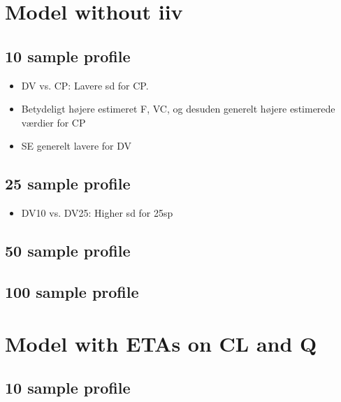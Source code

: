 \section{Model without iiv}
\subsection{10 sample profile}




\begin{itemize}
    \item DV vs. CP: Lavere sd for CP. 
    \item Betydeligt højere estimeret F, VC, og desuden generelt højere estimerede værdier for CP
    \item SE generelt lavere for DV
\end{itemize}

\subsection{25 sample profile}

\begin{itemize}
    \item DV10 vs. DV25: Higher sd for 25sp
\end{itemize}




\subsection{50 sample profile}





\subsection{100 sample profile}




\section{Model with ETAs on CL and Q}
\subsection{10 sample profile}


